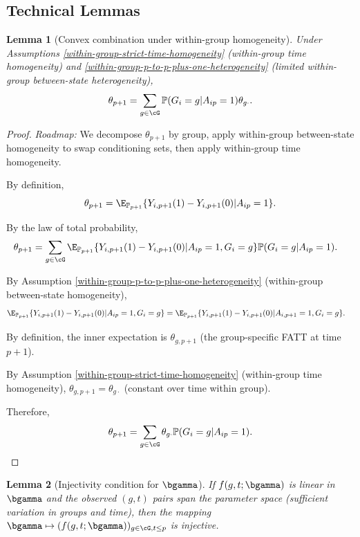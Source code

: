 \documentclass{article}
\newtheorem{lemma}{Lemma}
\renewcommand{\P}{\mathbb{P}}
\begin{document}
\subsection{Technical Lemmas}\label{app:lemmas}

\begin{lemma}[Convex combination under within-group homogeneity]\label{lem:convex}
Under Assumptions \ref{within-group-strict-time-homogeneity} (within-group time homogeneity) and \ref{within-group-p-to-p-plus-one-heterogeneity} (limited within-group between-state heterogeneity),
\[
\theta_{p+1} = \sum_{g \in \cG} \P(G_i = g | A_{ip} = 1) \theta_{g\cdot}.
\]
\end{lemma}

\begin{proof}
\textit{Roadmap:} We decompose $\theta_{p+1}$ by group, apply within-group between-state homogeneity to swap conditioning sets, then apply within-group time homogeneity.

By definition,
\[
\theta_{p+1} = \E_{\P_{p+1}}\{Y_{i,p+1}(1) - Y_{i,p+1}(0) | A_{ip} = 1\}.
\]

By the law of total probability,
\begin{align*}
\theta_{p+1} &= \sum_{g \in \cG} \E_{\P_{p+1}}\{Y_{i,p+1}(1) - Y_{i,p+1}(0) | A_{ip} = 1, G_i = g\} \P(G_i = g | A_{ip} = 1).
\end{align*}

By Assumption \ref{within-group-p-to-p-plus-one-heterogeneity} (within-group between-state homogeneity),
\begin{align*}
\E_{\P_{p+1}}\{Y_{i,p+1}(1) - Y_{i,p+1}(0) | A_{ip} = 1, G_i = g\}
&= \E_{\P_{p+1}}\{Y_{i,p+1}(1) - Y_{i,p+1}(0) | A_{i,p+1} = 1, G_i = g\}.
\end{align*}

By definition, the inner expectation is $\theta_{g,p+1}$ (the group-specific FATT at time $p+1$).

By Assumption \ref{within-group-strict-time-homogeneity} (within-group time homogeneity), $\theta_{g,p+1} = \theta_{g\cdot}$ (constant over time within group).

Therefore,
\[
\theta_{p+1} = \sum_{g \in \cG} \theta_{g\cdot} \P(G_i = g | A_{ip} = 1). \qedhere
\]
\end{proof}

\begin{lemma}[Injectivity condition for $\bgamma$]\label{lem:injectivity}
If $f(g,t;\bgamma)$ is linear in $\bgamma$ and the observed $(g,t)$ pairs span the parameter space (sufficient variation in groups and time), then the mapping $\bgamma \mapsto (f(g,t;\bgamma))_{g \in \cG, t \leq p}$ is injective.
\end{lemma}
\end{document}
